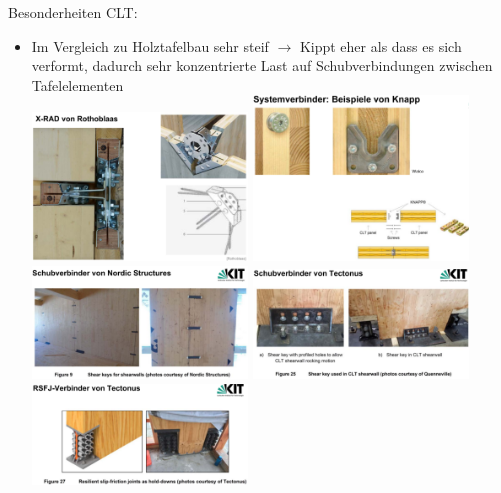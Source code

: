 \documentclass[fleqn,twoside]{article}
\begin{document}
Besonderheiten CLT:
    \begin{itemize}
        \item Im Vergleich zu Holztafelbau sehr steif $\rightarrow$ Kippt eher als dass es sich verformt, dadurch sehr konzentrierte Last auf Schubverbindungen zwischen Tafelelementen\\
        \includegraphics[width=0.45\textwidth]{Grafiken/CLT-Verbindungen/X-RAD Rothoblaas.png}
        \includegraphics[width=0.45\textwidth]{Grafiken/CLT-Verbindungen/Knapp Systemverbinder.png}\\
        \includegraphics[width=0.45\textwidth]{Grafiken/CLT-Verbindungen/Nordic Structures Schubverbinder.png}
        \includegraphics[width=0.45\textwidth]{Grafiken/CLT-Verbindungen/Tectonus Schubverbinder.png}\\
        \includegraphics[width=0.45\textwidth]{Grafiken/CLT-Verbindungen/Tectonus RSFJ.png}

\end{itemize}
\end{document}
